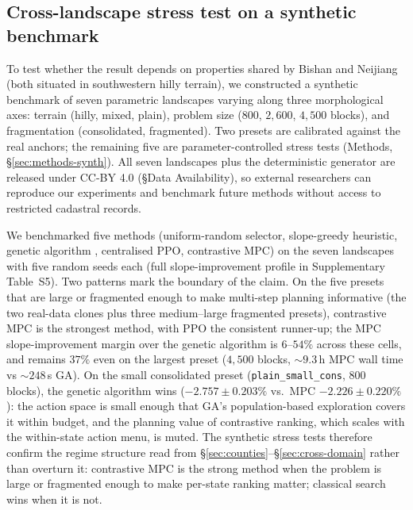\documentclass[11pt]{article}
\begin{document}
\subsection{Cross-landscape stress test on a synthetic benchmark}\label{sec:bench}

To test whether the result depends on properties shared by Bishan and Neijiang (both situated in southwestern hilly terrain), we constructed a synthetic benchmark of seven parametric landscapes varying along three morphological axes: terrain (hilly, mixed, plain), problem size ($800$, $2{,}600$, $4{,}500$ blocks), and fragmentation (consolidated, fragmented). Two presets are calibrated against the real anchors; the remaining five are parameter-controlled stress tests (Methods, \S\ref{sec:methods-synth}). All seven landscapes plus the deterministic generator are released under CC-BY 4.0 (\S Data Availability), so external researchers can reproduce our experiments and benchmark future methods without access to restricted cadastral records.

We benchmarked five methods (uniform-random selector, slope-greedy heuristic, genetic algorithm \citep{cao2012boundary}, centralised PPO, contrastive MPC) on the seven landscapes with five random seeds each (full slope-improvement profile in Supplementary Table~S5). Two patterns mark the boundary of the claim. On the five presets that are large or fragmented enough to make multi-step planning informative (the two real-data clones plus three medium--large fragmented presets), contrastive MPC is the strongest method, with PPO the consistent runner-up; the MPC slope-improvement margin over the genetic algorithm is $6$--$54\%$ across these cells, and remains $37\%$ even on the largest preset ($4{,}500$ blocks, $\sim$$9.3$\,h MPC wall time vs $\sim$$248$\,s GA). On the small consolidated preset (\texttt{plain\_small\_cons}, $800$ blocks), the genetic algorithm wins ($-2.757 \pm 0.203\%$ vs.\ MPC $-2.226 \pm 0.220\%$): the action space is small enough that GA's population-based exploration covers it within budget, and the planning value of contrastive ranking, which scales with the within-state action menu, is muted. The synthetic stress tests therefore confirm the regime structure read from \S\ref{sec:counties}--\S\ref{sec:cross-domain} rather than overturn it: contrastive MPC is the strong method when the problem is large or fragmented enough to make per-state ranking matter; classical search wins when it is not.
\end{document}
